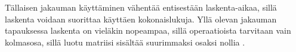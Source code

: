 Tällaisen jakauman käyttäminen vähentää entisestään laskenta-aikaa, sillä laskenta voidaan suorittaa käyttäen kokonaislukuja. Yllä olevan jakauman tapauksessa laskenta on vieläkin nopeampaa, sillä operaatioista
tarvitaan vain kolmasosa, sillä luotu matriisi sisältää suurimmaksi osaksi nollia \cite{Random}.

